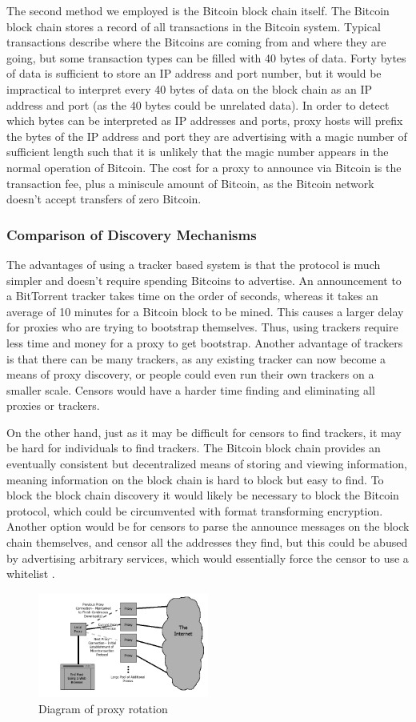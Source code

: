 The second method we employed is the Bitcoin block chain itself. The Bitcoin block chain stores a record of all transactions in the Bitcoin system. Typical transactions describe where the Bitcoins are coming from and where they are going, but some transaction types can be filled with 40 bytes of data. Forty bytes of data is sufficient to store an IP address and port number, but it would be impractical to interpret every 40 bytes of data on the block chain as an IP address and port (as the 40 bytes could be unrelated data). In order to detect which bytes can be interpreted as IP addresses and ports, proxy hosts will prefix the bytes of the IP address and port they are advertising with a magic number of sufficient length such that it is unlikely that the magic number appears in the normal operation of Bitcoin. The cost for a proxy to announce via Bitcoin is the transaction fee, plus a miniscule amount of Bitcoin, as the Bitcoin network doesn't accept transfers of zero Bitcoin.

\subsubsection{Comparison of Discovery Mechanisms}
The advantages of using a tracker based system is that the protocol is much simpler and doesn't require spending Bitcoins to advertise. An announcement to a BitTorrent tracker takes time on the order of seconds, whereas it takes an average of 10 minutes for a Bitcoin block to be mined. This causes a larger delay for proxies who are trying to bootstrap themselves. Thus, using trackers require less time and money for a proxy to get bootstrap. Another advantage of trackers is that there can be many trackers, as any existing tracker can now become a means of proxy discovery, or people could even run their own trackers on a smaller scale. Censors would have a harder time finding and eliminating all proxies or trackers.

On the other hand, just as it may be difficult for censors to find trackers, it may be hard for individuals to find trackers. The Bitcoin block chain provides an eventually consistent but decentralized means of storing and viewing information, meaning information on the block chain is hard to block but easy to find. To block the block chain discovery it would likely be necessary to block the Bitcoin protocol, which could be circumvented with format transforming encryption. Another option would be for censors to parse the announce messages on the block chain themselves, and censor all the addresses they find, but this could be abused by advertising arbitrary services, which would essentially force the censor to use a whitelist
.


\begin{figure}
  \centering
  \includegraphics[width=0.5\textwidth]{proxydiagram.png}
  \caption{Diagram of proxy rotation}
  \label{fig:proxy-diagram}
\end{figure}